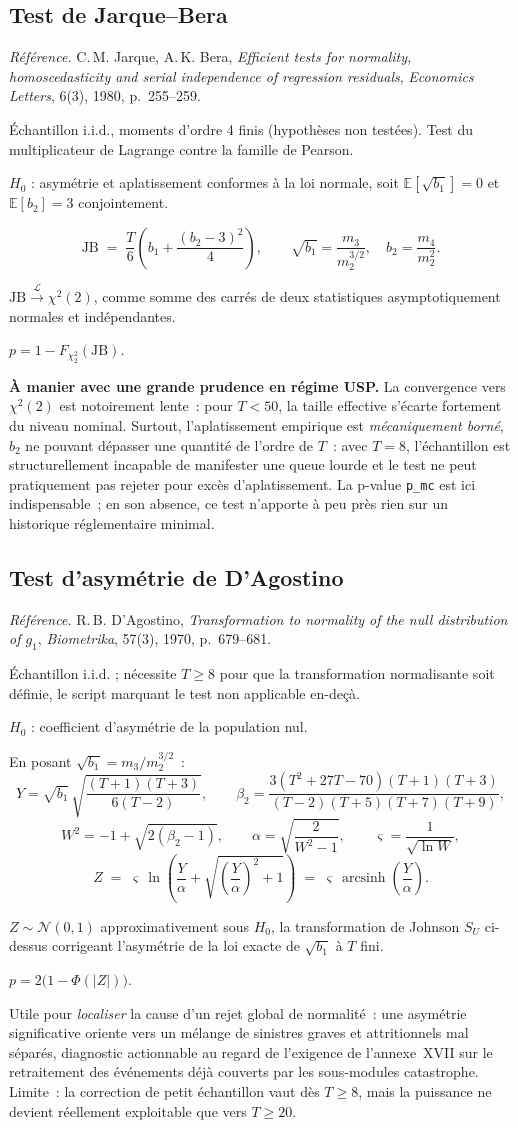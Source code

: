 \documentclass[a4paper,11pt]{article}
\newcommand{\code}[1]{\texttt{\small #1}}
\newcommand{\refl}[1]{{\small\textcolor{maincolor!70!black}{\textit{Référence.} #1}}\par\smallskip}
\newcounter{ficheid}
\newenvironment{fiche}[1]{%
  \stepcounter{ficheid}%
  \phantomsection
  \subsection{#1}%
  \label{fiche:\theficheid}%
}{%
  \end{description}\vspace{0.5em}%
}
\newcommand{\Cadre}{%
  \begin{description}[leftmargin=0pt, style=unboxed, itemsep=3pt, topsep=3pt, parsep=2pt]%
  \item[\textcolor{financeblue}{\textbf{1. Cadre, notations et hypothèses de validité (non testées).}}]}
\newcommand{\Hzero}{\item[\textcolor{financeblue}{\textbf{2. Hypothèse nulle.}}]}
\newcommand{\Stat}{\item[\textcolor{financeblue}{\textbf{3. Statistique de test.}}]}
\newcommand{\Loi}{\item[\textcolor{financeblue}{\textbf{4. Loi sous $H_0$.}}]}
\newcommand{\Pval}{\item[\textcolor{financeblue}{\textbf{5. p-value.}}]}
\newcommand{\Usage}{\item[\textcolor{financeblue}{\textbf{6. Usage et limites.}}]}
\begin{document}
\begin{fiche}{Test de Jarque--Bera}
\refl{C.\,M. Jarque, A.\,K. Bera, \emph{Efficient tests for normality, homoscedasticity and
serial independence of regression residuals}, \emph{Economics Letters}, 6(3), 1980, p.~255--259.}
\Cadre
Échantillon i.i.d., moments d'ordre 4 finis (hypothèses non testées). Test du multiplicateur de
Lagrange contre la famille de Pearson.
\Hzero
$H_0$ : asymétrie et aplatissement conformes à la loi normale, soit $\mathbb{E}[\sqrt{b_1}] = 0$
et $\mathbb{E}[b_2] = 3$ conjointement.
\Stat
\[
  \mathrm{JB} \;=\; \frac{T}{6}\left(b_1 + \frac{(b_2-3)^2}{4}\right),
  \qquad
  \sqrt{b_1} = \frac{m_3}{m_2^{3/2}},\quad b_2 = \frac{m_4}{m_2^{2}} .
\]
\Loi
$\mathrm{JB} \xrightarrow{\ \mathcal{L}\ } \chi^2(2)$, comme somme des carrés de deux
statistiques asymptotiquement normales et indépendantes.
\Pval
$p = 1 - F_{\chi^2_2}(\mathrm{JB})$.
\Usage
\textbf{À manier avec une grande prudence en régime USP.} La convergence vers $\chi^2(2)$ est
notoirement lente~: pour $T < 50$, la taille effective s'écarte fortement du niveau nominal.
Surtout, l'aplatissement empirique est \emph{mécaniquement borné}, $b_2$ ne pouvant dépasser une
quantité de l'ordre de $T$~: avec $T = 8$, l'échantillon est structurellement incapable de
manifester une queue lourde et le test ne peut pratiquement pas rejeter pour excès
d'aplatissement. La p-value \code{p\_mc} est ici indispensable~; en son absence, ce test n'apporte
à peu près rien sur un historique réglementaire minimal.
\end{fiche}

\begin{fiche}{Test d'asymétrie de D'Agostino}
\refl{R.\,B. D'Agostino, \emph{Transformation to normality of the null distribution of $g_1$},
\emph{Biometrika}, 57(3), 1970, p.~679--681.}
\Cadre
Échantillon i.i.d. ; nécessite $T \ge 8$ pour que la transformation normalisante soit définie, le
script marquant le test non applicable en-deçà.
\Hzero
$H_0$ : coefficient d'asymétrie de la population nul.
\Stat
En posant $\sqrt{b_1} = m_3/m_2^{3/2}$~:
\[
  Y = \sqrt{b_1}\,\sqrt{\frac{(T+1)(T+3)}{6(T-2)}},
  \qquad
  \beta_2 = \frac{3(T^2+27T-70)(T+1)(T+3)}{(T-2)(T+5)(T+7)(T+9)},
\]
\[
  W^2 = -1 + \sqrt{2(\beta_2-1)},\qquad
  \alpha = \sqrt{\frac{2}{W^2-1}},\qquad
  \varsigma = \frac{1}{\sqrt{\ln W}},
\]
\[
  Z \;=\; \varsigma \,\ln\!\left(\frac{Y}{\alpha} + \sqrt{\left(\frac{Y}{\alpha}\right)^2 + 1}\right)
    \;=\; \varsigma\,\operatorname{arcsinh}\!\left(\frac{Y}{\alpha}\right).
\]
\Loi
$Z \sim \mathcal{N}(0,1)$ approximativement sous $H_0$, la transformation de Johnson $S_U$
ci-dessus corrigeant l'asymétrie de la loi exacte de $\sqrt{b_1}$ à $T$ fini.
\Pval
$p = 2\big(1 - \Phi(|Z|)\big)$.
\Usage
Utile pour \emph{localiser} la cause d'un rejet global de normalité~: une asymétrie significative
oriente vers un mélange de sinistres graves et attritionnels mal séparés, diagnostic actionnable
au regard de l'exigence de l'annexe~XVII sur le retraitement des événements déjà couverts par les
sous-modules catastrophe. Limite~: la correction de petit échantillon vaut dès $T \ge 8$, mais la
puissance ne devient réellement exploitable que vers $T \ge 20$.
\end{fiche}
\end{document}
